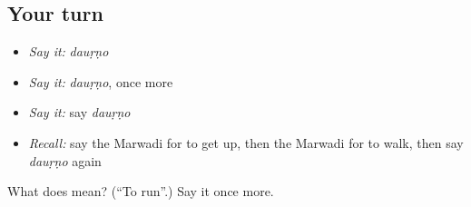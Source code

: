 \subsection*{Your turn}
\begin{itemize}
\raggedright
  \item \emph{Say it:} \emph{dauṛṇo}
  \item \emph{Say it:} \emph{dauṛṇo}, once more
  \item \emph{Say it:} say \emph{dauṛṇo}
  \item \emph{Recall:} say the Marwadi for to get up, then the Marwadi for to walk, then say \emph{dauṛṇo} again
\end{itemize}

\begin{tcolorbox}[breakable,colback=teal!4,colframe=teal!35!black,title={Before you move on}]
What does  mean? (\textquotedblleft{}To run\textquotedblright{}.) Say it once more.
\end{tcolorbox}
